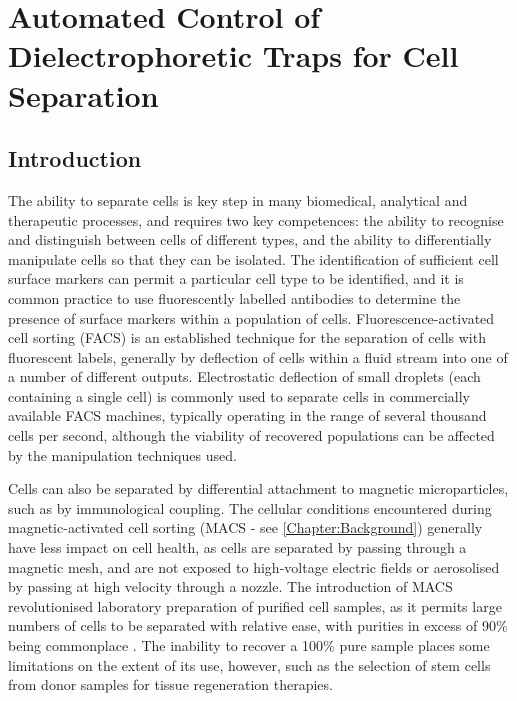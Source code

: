 \chapter{Automated Control of Dielectrophoretic Traps for Cell Separation} 
\label{Chapter:Autotrapping}

\section{Introduction}

The ability to separate cells is key step in many biomedical, analytical and therapeutic processes, and requires two key competences: the ability to recognise and distinguish between cells of different types, and the ability to differentially manipulate cells so that they can be isolated. The identification of sufficient cell surface markers can permit a particular cell type to be identified, and it is common practice to use fluorescently labelled antibodies to determine the presence of surface markers within a population of cells. Fluorescence-activated cell sorting (FACS) is an established technique for the separation of cells with fluorescent labels, generally by deflection of cells within a fluid stream into one of a number of different outputs. Electrostatic deflection of small droplets (each containing a single cell) is commonly used to separate cells in commercially available FACS machines, typically operating in the range of several thousand cells per second, although the viability of recovered populations can be affected by the manipulation techniques used.

Cells can also be separated by differential attachment to magnetic microparticles, such as by immunological coupling. The cellular conditions encountered during magnetic-activated cell sorting (MACS - see \cref{Chapter:Background}) generally have less impact on cell health, as cells are separated by passing through a magnetic mesh, and are not exposed to high-voltage electric fields or aerosolised by passing at high velocity through a nozzle. The introduction of MACS revolutionised laboratory preparation of purified cell samples, as it permits large numbers of cells to be separated with relative ease, with purities in excess of 90\% being commonplace \citep{Willasch:2009}. The inability to recover a 100\% pure sample places some limitations on the extent of its use, however, such as the selection of stem cells from donor samples for tissue regeneration therapies.

